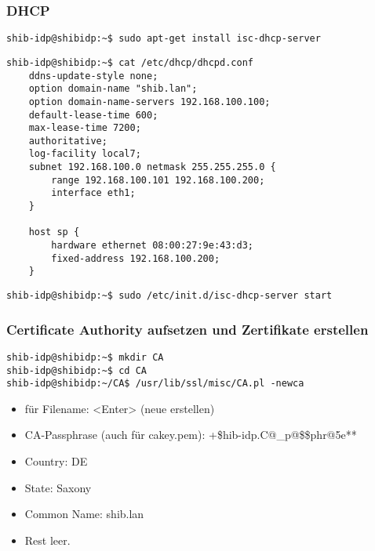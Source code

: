 \subsubsection{DHCP}
\begin{lstlisting}
shib-idp@shibidp:~$ sudo apt-get install isc-dhcp-server
\end{lstlisting}
\begin{lstlisting}
shib-idp@shibidp:~$ cat /etc/dhcp/dhcpd.conf
	ddns-update-style none;
	option domain-name "shib.lan";
	option domain-name-servers 192.168.100.100;
	default-lease-time 600;
	max-lease-time 7200;
	authoritative;
	log-facility local7;
	subnet 192.168.100.0 netmask 255.255.255.0 {
		range 192.168.100.101 192.168.100.200;
		interface eth1;
	}

	host sp {
		hardware ethernet 08:00:27:9e:43:d3;
		fixed-address 192.168.100.200;
	}
\end{lstlisting}

\begin{lstlisting}
shib-idp@shibidp:~$ sudo /etc/init.d/isc-dhcp-server start
\end{lstlisting}
\subsubsection{Certificate Authority aufsetzen und Zertifikate erstellen}
\begin{lstlisting}
shib-idp@shibidp:~$ mkdir CA
shib-idp@shibidp:~$ cd CA
shib-idp@shibidp:~/CA$ /usr/lib/ssl/misc/CA.pl -newca
\end{lstlisting}
\begin{itemize}
 \item für Filename: <Enter> (neue erstellen)
 \item CA-Passphrase (auch für cakey.pem): +\$hib-idp.C@\_p@\$\$phr@5e**
 \item Country: DE
 \item State: Saxony
 \item Common Name: shib.lan
 \item Rest leer.
\end{itemize}

